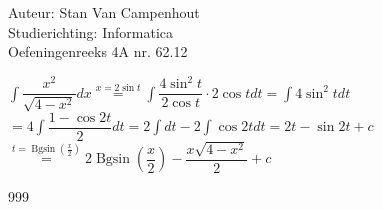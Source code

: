 \documentclass[a4paper]{article}
\begin{document}
  
\noindent \large Auteur: Stan Van Campenhout \\
\noindent \large Studierichting:  Informatica\\
\noindent \large Oefeningenreeks 4A nr. 62.12\\

\medskip

\normalsize

$ \displaystyle\int\dfrac{x^2}{\sqrt{4-x^2}}dx \stackrel{x=2\sin t}{=} \displaystyle\int\dfrac{4\sin^2t}{2\cos t}\cdot2\cos tdt = \displaystyle\int4\sin^2tdt $\\

$ = 4\displaystyle\int\dfrac{1-\cos2t}{2}dt = 2\displaystyle\int dt-2\displaystyle\int\cos 2tdt = 2t - \sin 2t + c $\\

$ \stackrel{t = \operatorname{Bgsin}\left(\tfrac{x}{2}\right)}{=} 2\operatorname{Bgsin}\left(\dfrac{x}{2}\right) - \dfrac{x\sqrt{4-x^2}}{2} + c $\\

\begin{thebibliography}{999}
\end{thebibliography}
\end{document}
